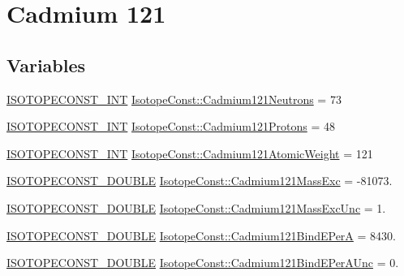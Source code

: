 \hypertarget{group___isotope_const-_cadmium-_cd121}{}\section{Cadmium 121}
\label{group___isotope_const-_cadmium-_cd121}
\subsection*{Variables}
\begin{DoxyCompactItemize}
\item 
\mbox{\hyperlink{group___isotope_const-_macros_ga5f18360b3e99483a35c32d789e62621c}{I\+S\+O\+T\+O\+P\+E\+C\+O\+N\+S\+T\+\_\+\+I\+NT}} \mbox{\hyperlink{group___isotope_const-_cadmium-_cd121_ga389d6e76f35e7a294244810bb08ad235}{Isotope\+Const\+::\+Cadmium121\+Neutrons}} = 73
\item 
\mbox{\hyperlink{group___isotope_const-_macros_ga5f18360b3e99483a35c32d789e62621c}{I\+S\+O\+T\+O\+P\+E\+C\+O\+N\+S\+T\+\_\+\+I\+NT}} \mbox{\hyperlink{group___isotope_const-_cadmium-_cd121_ga52166eb12215099f2f102285c13eecbb}{Isotope\+Const\+::\+Cadmium121\+Protons}} = 48
\item 
\mbox{\hyperlink{group___isotope_const-_macros_ga5f18360b3e99483a35c32d789e62621c}{I\+S\+O\+T\+O\+P\+E\+C\+O\+N\+S\+T\+\_\+\+I\+NT}} \mbox{\hyperlink{group___isotope_const-_cadmium-_cd121_ga21672d962638a070077d71566cc763d9}{Isotope\+Const\+::\+Cadmium121\+Atomic\+Weight}} = 121
\item 
\mbox{\hyperlink{group___isotope_const-_macros_ga8f45a7272ce02c0b4c65c44636ed719a}{I\+S\+O\+T\+O\+P\+E\+C\+O\+N\+S\+T\+\_\+\+D\+O\+U\+B\+LE}} \mbox{\hyperlink{group___isotope_const-_cadmium-_cd121_gaef46855117638ed070824aa7cde784fd}{Isotope\+Const\+::\+Cadmium121\+Mass\+Exc}} = -\/81073.
\item 
\mbox{\hyperlink{group___isotope_const-_macros_ga8f45a7272ce02c0b4c65c44636ed719a}{I\+S\+O\+T\+O\+P\+E\+C\+O\+N\+S\+T\+\_\+\+D\+O\+U\+B\+LE}} \mbox{\hyperlink{group___isotope_const-_cadmium-_cd121_ga45a67b3502a3667696e7d6d67e1b1187}{Isotope\+Const\+::\+Cadmium121\+Mass\+Exc\+Unc}} = 1.
\item 
\mbox{\hyperlink{group___isotope_const-_macros_ga8f45a7272ce02c0b4c65c44636ed719a}{I\+S\+O\+T\+O\+P\+E\+C\+O\+N\+S\+T\+\_\+\+D\+O\+U\+B\+LE}} \mbox{\hyperlink{group___isotope_const-_cadmium-_cd121_ga05e196146d57b06e619aa36b134a18fb}{Isotope\+Const\+::\+Cadmium121\+Bind\+E\+PerA}} = 8430.
\item 
\mbox{\hyperlink{group___isotope_const-_macros_ga8f45a7272ce02c0b4c65c44636ed719a}{I\+S\+O\+T\+O\+P\+E\+C\+O\+N\+S\+T\+\_\+\+D\+O\+U\+B\+LE}} \mbox{\hyperlink{group___isotope_const-_cadmium-_cd121_ga28714434afe8351291b81dc1875be45e}{Isotope\+Const\+::\+Cadmium121\+Bind\+E\+Per\+A\+Unc}} = 0.

\end{DoxyCompactItemize}
